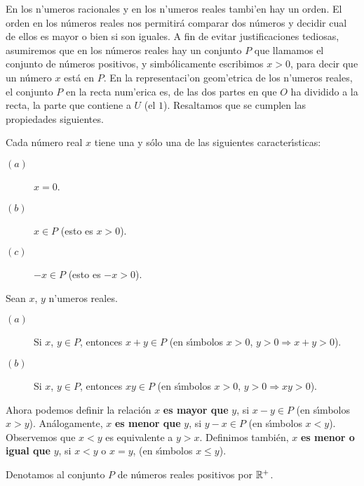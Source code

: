 En los n'umeros racionales y en los n'umeros reales tambi'en hay un orden.   El orden en los n\'umeros reales
nos permitir\'a comparar dos n\'umeros y
decidir cual de ellos es mayor o bien si son iguales. A fin de evitar
justificaciones tediosas, asumiremos que en los n\'umeros reales hay un
conjunto $P$ que llamamos el conjunto de n\'umeros positivos, y
simb\'olicamente escribimos $x>0$, para decir que un n\'umero $x$
est\'a en $P$. En la representaci'on geom'etrica de los n'umeros reales, el conjunto $P$ en la 
recta num'erica es, de las dos partes en que $O$ ha dividido a la recta, la parte que contiene a $U$ (el $1$). Resaltamos que se cumplen las   propiedades siguientes.

\ve

\begin{propiedad}
Cada n\'umero real $x$ tiene una y s\'olo una de
las siguientes caracter\'{\i}sticas:
\label{tricotomia}
\begin{description}
\item[$ (a)$] $x=0$.
\item[$(b)$] $x \in P$ (esto es $x>0$).
\item[$(c)$]$-x\in P$ (esto es $-x>0$).
\end{description}
\end{propiedad}

\begin{propiedad} 
Sean $x$, $y$ n'umeros reales.
\begin{description}
\item[$(a)$] Si $x$, $y \in P$, entonces $x+y\in P$
\noindent (en s\'{\i}mbolos $x>0$, $y>0\Rightarrow x+y>0$).
\label{propsuma}
\item[$(b)$] Si $x$, $y\in P$, entonces $xy\in P$
(en s\'{\i}mbolos $x>0$, $y>0\Rightarrow xy>0$).
\label{propproducto}
\end{description}
\end{propiedad}

\noindent Ahora podemos definir la relaci\'on $x$ {\bf es mayor que}
 $y$,
si $x-y\in P$ (en s\'{\i}mbolos $x>y$). An\'alogamente, $x$ {\bf es menor
que} $y$, si $y-x\in P$ (en s\'{\i}mbolos $x<y$).
Observemos que
$x<y$ es equivalente a $y>x$. Definimos tambi\'en, $x$ {\bf es menor o igual
que} $y$, si $x<y$ o $x=y$,
(en s\'{\i}mbolos $x\leq y$).

\noindent Denotamos al conjunto $P$ de
n\'umeros reales positivos por $\mathbb{R}^{+}$.

